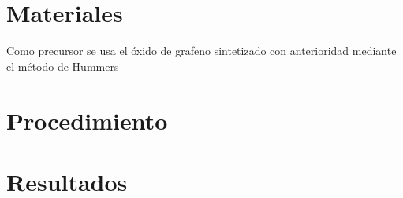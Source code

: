 
\section{Materiales}
Como precursor se usa el óxido de grafeno sintetizado con anterioridad mediante el método de Hummers
\section{Procedimiento}

\section{Resultados}